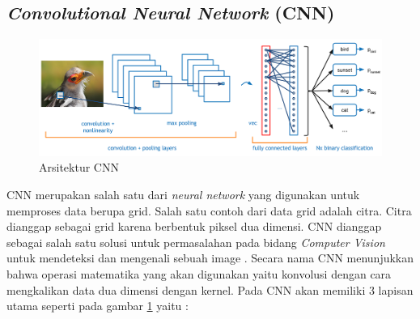 \subsection{\textit{Convolutional Neural Network} (CNN)}
\begin{figure}[!h]
  \centering
  \includegraphics[width=1\linewidth]{gambar/cnn.png}
  \caption{Arsitektur CNN \parencite{adit}}
  \label{fig:cnn}
\end{figure}
CNN merupakan salah satu dari \textit{neural network} yang digunakan untuk memproses data berupa grid. Salah satu contoh dari data grid adalah citra. Citra dianggap sebagai grid karena berbentuk piksel dua dimensi. CNN dianggap sebagai salah satu solusi untuk permasalahan pada bidang \textit{Computer Vision} untuk mendeteksi dan mengenali sebuah image \parencite{CNN}. Secara nama CNN menunjukkan bahwa operasi matematika yang akan digunakan yaitu konvolusi dengan cara mengkalikan data dua dimensi dengan kernel. Pada CNN akan memiliki 3 lapisan utama seperti pada gambar \ref*{fig:cnn} yaitu :

